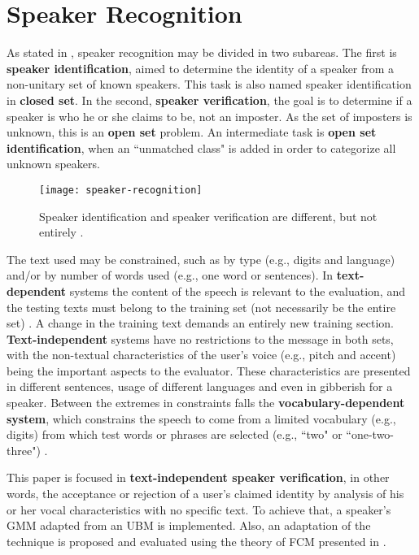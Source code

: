 \section{Speaker Recognition}
\label{sec:speaker-recognition}

As stated in \cite{reynolds.campbell.2008}, speaker recognition may be divided in two subareas. The first is \textbf{speaker identification}, aimed to determine the identity of a speaker from a non-unitary set of known speakers. This task is also named speaker identification in \textbf{closed set}. In the second, \textbf{speaker verification}, the goal is to determine if a speaker is who he or she claims to be, not an imposter. As the set of imposters is unknown, this is an \textbf{open set} problem. An intermediate task is \textbf{open set identification}, when an ``unmatched class" is added in order to categorize all unknown speakers.

\begin{figure}[ht]
    \centering
    \texttt{[image: speaker-recognition]}
    \caption{Speaker identification and speaker verification are different, but not entirely \cite{reynolds.1995a}.}
    \label{fig:speaker-recognition}
\end{figure}

The text used may be constrained, such as by type (e.g., digits and language) and/or by number of words used (e.g., one word or sentences). In \textbf{text-dependent} systems the content of the speech is relevant to the evaluation, and the testing texts must belong to the training set (not necessarily be the entire set) \cite{hebert.2008}. A change in the training text demands an entirely new training section. \textbf{Text-independent} systems have no restrictions to the message in both sets, with the non-textual characteristics of the user's voice (e.g., pitch and accent) being the important aspects to the evaluator. These characteristics are presented in different sentences, usage of different languages and even in gibberish for a speaker. Between the extremes in constraints falls the \textbf{vocabulary-dependent system}, which constrains the speech to come from a limited vocabulary (e.g., digits) from which test words or phrases are selected (e.g., ``two" or ``one-two-three") \cite{reynolds.1995a}.

This paper is focused in \textbf{text-independent speaker verification}, in other words, the acceptance or rejection of a user's claimed identity by analysis of his or her vocal characteristics with no specific text. To achieve that, a speaker's GMM adapted from an UBM \cite{reynolds.quatieri.dunn.2000} is implemented. Also, an adaptation of the technique is proposed and evaluated using the theory of FCM presented in \cite{gao.zhou.pu.2013}.

